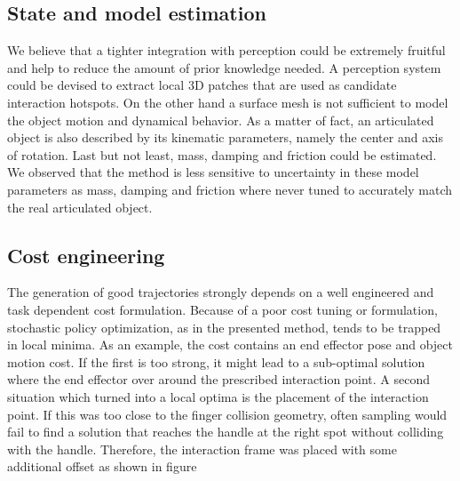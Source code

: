 \subsection{State and model estimation}
We believe that a tighter integration with perception could be extremely fruitful and help to reduce the amount of prior knowledge needed. A perception system could be devised to extract local 3D patches that are used as candidate interaction hotspots. On the other hand a surface mesh is not sufficient to model the object motion and dynamical behavior. As a matter of fact, an articulated object is also described by its kinematic parameters, namely the center and axis of rotation. Last but not least, mass, damping and friction could be estimated. We observed that the method is less sensitive to uncertainty in these model parameters as mass, damping and friction where never tuned to accurately match the real articulated object. 

\subsection{Cost engineering}
The generation of good trajectories strongly depends on a well engineered and task dependent cost formulation. Because of a poor cost tuning or formulation, stochastic policy optimization, as in the presented method, tends to be trapped in local minima. As an example, the cost contains an end effector pose and object motion cost. If the first is too strong, it might lead to a sub-optimal solution where the end effector over around the prescribed interaction point. A second situation which turned into a local optima is the placement of the interaction point. If this was too close to the finger collision geometry, often sampling would fail to find a solution that reaches the handle at the right spot without colliding with the handle. Therefore, the interaction frame was placed with some additional offset as shown in figure 

